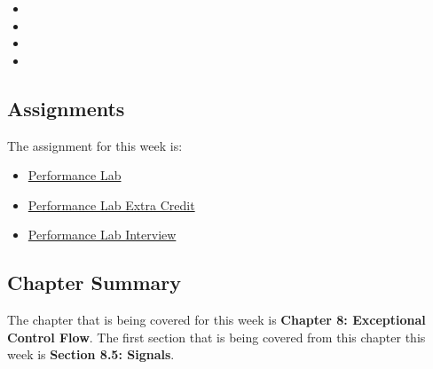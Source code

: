 \begin{itemize}
    \item {}
    \item {}
    \item {}
    \item {}
\end{itemize}

\subsection{Assignments}

The assignment for this week is:

\begin{itemize}
    \item \href{https://github.com/QuantumCompiler/CU/tree/main/CSPB%202400%20-%20Computer%20Systems/Assignments/Assignment%204%20-%20Performance%20Lab}{Performance Lab}
    \item \href{https://github.com/QuantumCompiler/CU/tree/main/CSPB%202400%20-%20Computer%20Systems/Assignments/Assignment%204%20-%20Performance%20Lab}{Performance Lab Extra Credit}
    \item \href{https://github.com/QuantumCompiler/CU/tree/main/CSPB%202400%20-%20Computer%20Systems/Assignments/Assignment%204%20-%20Performance%20Lab}{Performance Lab Interview}
\end{itemize}

\subsection{Chapter Summary}

The chapter that is being covered for this week is \textbf{Chapter 8: Exceptional Control Flow}. The first section that is being covered from this chapter this week is \textbf{Section 8.5: Signals}.

